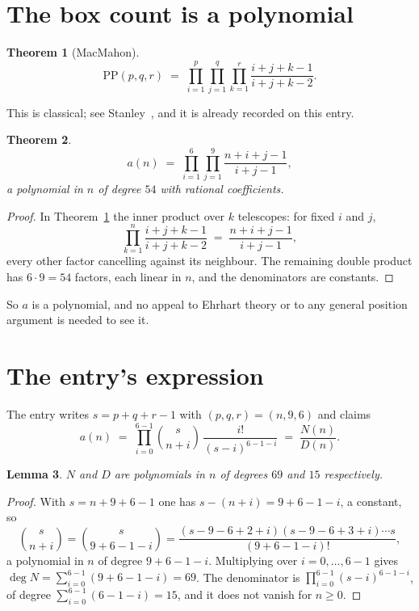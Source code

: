 \documentclass[11pt,a4paper]{article}
\theoremstyle{plain}
\newtheorem{theorem}{Theorem}
\newtheorem{lemma}[theorem]{Lemma}
\theoremstyle{definition}
\begin{document}
\section{The box count is a polynomial}

\begin{theorem}[MacMahon]\label{thm:mm}
\[
\mathrm{PP}(p,q,r)\;=\;\prod_{i=1}^{p}\prod_{j=1}^{q}\prod_{k=1}^{r}
\frac{i+j+k-1}{i+j+k-2} .
\]
\end{theorem}

This is classical; see Stanley~\cite{stanley}, and it is already recorded on this entry.

\begin{theorem}\label{thm:poly}
\[
a(n)\;=\;\prod_{i=1}^{6}\prod_{j=1}^{9}\frac{n+i+j-1}{i+j-1},
\]
a polynomial in $n$ of degree $54$ with rational coefficients.
\end{theorem}

\begin{proof}
In Theorem~\ref{thm:mm} the inner product over $k$ telescopes: for fixed $i$ and $j$,
\[
\prod_{k=1}^{n}\frac{i+j+k-1}{i+j+k-2}\;=\;\frac{n+i+j-1}{i+j-1} ,
\]
every other factor cancelling against its neighbour. The remaining double product has
$6\cdot9=54$ factors, each linear in $n$, and the denominators are constants.
\end{proof}

So $a$ is a polynomial, and no appeal to Ehrhart theory or to any general position argument is
needed to see it.

\section{The entry's expression}

The entry writes $s=p+q+r-1$ with $(p,q,r)=(n,9,6)$ and claims
\[
a(n)\;=\;\prod_{i=0}^{6-1}\binom{s}{n+i}\,\frac{i!}{(s-i)^{6-1-i}}\;=\;
\frac{N(n)}{D(n)} .
\]

\begin{lemma}\label{lem:deg}
$N$ and $D$ are polynomials in $n$ of degrees $69$ and $15$ respectively.
\end{lemma}

\begin{proof}
With $s=n+9+6-1$ one has $s-(n+i)=9+6-1-i$, a constant, so
\[
\binom{s}{n+i}=\binom{s}{9+6-1-i}
=\frac{(s-9-6+2+i)(s-9-6+3+i)\cdots s}{(9+6-1-i)!},
\]
a polynomial in $n$ of degree $9+6-1-i$. Multiplying over $i=0,\dots,6-1$ gives
$\deg N=\sum_{i=0}^{6-1}(9+6-1-i)=69$. The denominator is
$\prod_{i=0}^{6-1}(s-i)^{6-1-i}$, of degree
$\sum_{i=0}^{6-1}(6-1-i)=15$, and it does not vanish for $n\ge0$.
\end{proof}
\end{document}
